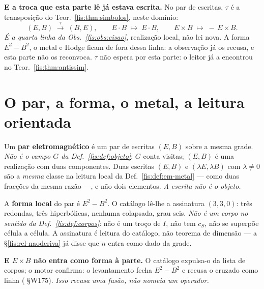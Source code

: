 \documentclass[livro.tex]{subfiles}
\begin{document}
\medskip\noindent\textbf{E a troca que esta parte lê já estava escrita.} No par
de escritas, $\tau$ é a transposição do Teor.~\ref{fis:thm:simbolos}, neste
domínio:
\[
(E,B)\;\xrightarrow{\ \tau\ }\;(B,E),\qquad
E\cdot B\;\longmapsto\; E\cdot B,\qquad
E\times B\;\longmapsto\; -\,E\times B.
\]
\emph{É a quarta linha da Obs.~\ref{fis:obs:cisao}}, realização local, não lei
nova. A forma $E^{2}-B^{2}$, o metal e Hodge ficam de fora dessa linha: a
observação já os recusa, e esta parte não os reconvoca. $\tau$ não espera por
esta parte: o leitor já a encontrou no Teor.~\ref{fis:thm:antissim}.

\section{O par, a forma, o metal, a leitura orientada}\label{fis:em-par}

\begin{definicao}\label{fis:def:em-par}
Um \textbf{par eletromagnético} é um par de escritas $(E,B)$ sobre a mesma
grade. \emph{Não é o campo $G$ da Def.~\ref{fis:def:objeto}}: $G$ conta
visitas; $(E,B)$ é uma realização com duas componentes. Duas escritas
$(E,B)$ e $(\lambda E,\lambda B)$ com $\lambda\neq0$ são a \emph{mesma} classe
na leitura local da Def.~\ref{fis:def:em-metal} --- como duas fracções da mesma
razão ---, e não dois elementos. \emph{A escrita não é o objeto.}
\end{definicao}

\begin{definicao}\label{fis:def:em-forma}
A \textbf{forma local} do par é $E^{2}-B^{2}$. O catálogo lê-lhe a assinatura
$(3,3,0)$: três redondas, três hiperbólicas, nenhuma colapsada, grau seis.
\emph{Não é um corpo no sentido da Def.~\ref{fis:def:corpos}}: não é um troço
de $I$, não tem $c_S$, não se superpõe célula a célula. A assinatura é leitura
do catálogo, não teorema de dimensão --- a §\ref{fis:rel-naoderiva} já disse
que $n$ entra como dado da grade.
\end{definicao}

\medskip\noindent\textbf{E $E\times B$ não entra como forma à parte.} O
catálogo expulsa-o da lista de corpos; o motor confirma: o levantamento fecha
$E^{2}-B^{2}$ e recusa o cruzado como linha ( §W175).
\emph{Isso recusa uma fusão, não nomeia um operador.}
\end{document}

